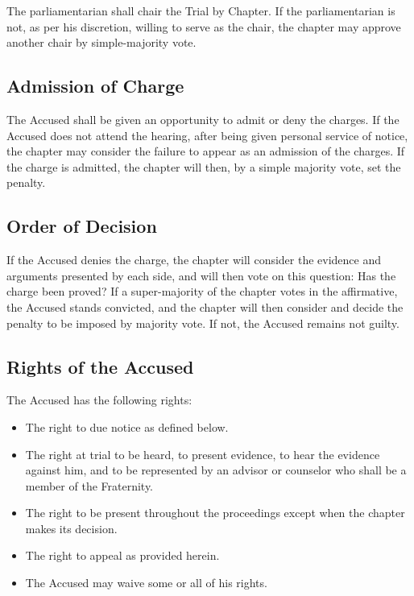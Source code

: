 The parliamentarian shall chair the Trial by Chapter.
If the parliamentarian is not, as per his discretion, willing to serve as the
chair, the chapter may approve another chair by simple-majority vote.

\subsection{Admission of Charge}

The Accused shall be given an opportunity to admit or deny the charges.
If the Accused does not attend the hearing, after being given personal service
of notice, the chapter may consider the failure to appear as an admission of
the charges.
If the charge is admitted, the chapter will then, by a simple majority vote,
set the penalty.

\subsection{Order of Decision}

If the Accused denies the charge, the chapter will consider the evidence and
arguments presented by each side, and will then vote on this question: Has the
charge been proved? If a super-majority of the chapter votes in the
affirmative, the Accused stands convicted, and the chapter will then consider
and decide the penalty to be imposed by majority vote.
If not, the Accused remains not guilty.

\subsection{Rights of the Accused}

The Accused has the following rights:
\begin{itemize}
    \item The right to due notice as defined below.
    \item The right at trial to be heard, to present evidence, to hear the
        evidence against him, and to be represented by an advisor or counselor
        who shall be a member of the Fraternity.
    \item The right to be present throughout the proceedings except when the
        chapter makes its decision.
    \item The right to appeal as provided herein.
    \item The Accused may waive some or all of his rights.
\end{itemize}

